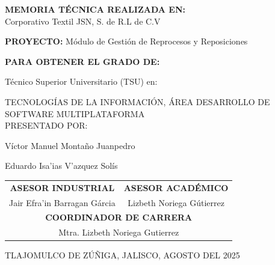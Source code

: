 \documentclass[12pt,letterpaper,spanish]{report}
\begin{document}
\begin{center}

\large{\textbf{MEMORIA TÉCNICA REALIZADA EN:}}
 \\  Corporativo Textil JSN, S. de R.L de C.V

\centerline{\hbox{}}

\large{\textbf{PROYECTO:} Módulo de Gestión de Reprocesos y Reposiciones}

\vspace{0.1in}
\large{\textbf{PARA OBTENER EL GRADO DE:}}

\large{Técnico Superior Universitario (TSU) en:}
\vspace{0.05in}

\large{TECNOLOGÍAS DE LA INFORMACIÓN, ÁREA DESARROLLO DE SOFTWARE MULTIPLATAFORMA }
\\
\large{PRESENTADO POR:}


Víctor Manuel Montaño Juanpedro %


Eduardo Isa'ias V'azquez Solís %

\vspace{0.2in}

\begin{tabular}{cc}
    \vspace{0.5in}
    \textbf{ASESOR INDUSTRIAL} & \textbf{ASESOR ACADÉMICO} \\

    Jair Efra'in Barragan Gárcia & Lizbeth Noriega Gútierrez \\
    \multicolumn{2}{c}{\textbf{COORDINADOR DE CARRERA}
    \vspace{0.4in}
    } \\

    \multicolumn{2}{c}{
            Mtra. Lizbeth Noriega Gutierrez }
    \end{tabular}

\end{center}
\begin{flushright}\small{ TLAJOMULCO DE ZÚÑIGA, JALISCO, AGOSTO DEL 2025} \end{flushright}

\newpage


\end{document}
